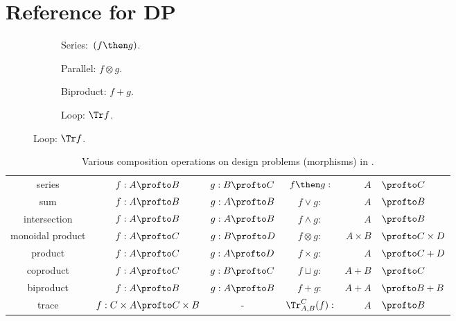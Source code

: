 
\section{Reference for DP}



\begin{figure}[h!]
    \centering
    \begin{subfigure}{0.2\textwidth}
        \centering
        \caption{Series:~$(f \then g)$.}
    \end{subfigure}
    \hspace{10mm} %
    \begin{subfigure}{0.2\textwidth}
        \centering
        \caption{Parallel: $f \otimes g$.}
    \end{subfigure}
    \hspace{10mm} %
    \begin{subfigure}{0.2\textwidth}
        \centering
        \caption{Biproduct: $f + g$.}
    \end{subfigure}
    \hspace{10mm} %
    \begin{subfigure}{0.2\textwidth}
        \centering
        \caption{Loop: $\Tr f$.}
    \end{subfigure}
    \label{fig:diagrams}
\end{figure}

\begin{table}[t!]
    \centering
    \begin{tabular}{c|c|c|crl}
        series &
        $f:A\profto B$ &
        $g:B\profto C$ &
        $f\then g:$ & $A$ & $\profto C$ \\
        sum &
        $f:A\profto B$ &
        $g:A\profto B$ &
        $f\vee g:$ & $A$ & $\profto B$ \\
        intersection &
        $f:A\profto B$ &
        $g:A\profto B$ &
        $f\wedge g:$ & $A$ & $\profto B$ \\
        monoidal product &
        $f:A\profto C$ &
        $g:B\profto D$ &
        $f\otimes g:$ & $A\times B$ & $\profto C \times D$ \\
        product &
        $f:A\profto C$ &
        $g:A\profto D$ &
        $f\times g:$ & $A $ & $\profto C + D$ \\
        coproduct &
        $f:A\profto C$ &
        $g:B\profto C$ &
        $f\sqcup g:$ & $A + B $ & $\profto C$ \\
        biproduct &
        $f:A\profto B$ &
        $g:A\profto B$ &
        $f+ g:$ & $A + A$ & $\profto B + B$ \\
        trace &
        $f: C \times A \profto C \times B$ &
        - &
        $\Tr_{A,B}^C(f) :$ & $A$ & $\profto B$
    \end{tabular}
    \caption{Various composition operations on design problems (\ie  morphisms) in \DP.}
\end{table}
